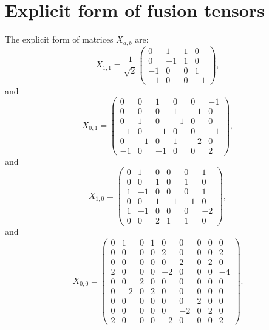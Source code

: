 \documentclass[prx, twocolumn, superscriptaddress, dvipsnames]{revtex4-2}
\theoremstyle{definition}
\begin{document}
\section{Explicit form of fusion tensors}
\label{app:fusion-tensor-expl}
The explicit form of matrices $X_{a,b}$ are:
\begin{equation}
    X_{1,1} = \frac{1}{\sqrt{2}}
    \begin{pmatrix}
        0 & 1 & 1 & 0 \\
        0 & -1 & 1 & 0 \\
        -1 & 0 & 0 & 1 \\
        -1 & 0 & 0 & -1 
    \end{pmatrix},
\end{equation}
and
\begin{equation}
    X_{0,1} =
    \begin{pmatrix}
        0 & 0 & 1 & 0 & 0 & -1 \\
        0 & 0 & 0 & 1 & -1 & 0 \\
        0 & 1 & 0 & -1 & 0 & 0 \\
        -1 & 0 & -1 & 0 & 0 & -1 \\
        0 & -1 & 0 & 1 & -2 & 0 \\
        -1 & 0 & -1 & 0 & 0 & 2
    \end{pmatrix},
\end{equation}
and
\begin{equation}
    X_{1,0} =
    \begin{pmatrix}
        0 & 1 & 0 & 0 & 0 & 1 \\
        0 & 0 & 1 & 0 & 1 & 0 \\
        1 & -1 & 0 & 0 & 0 & 1 \\
        0 & 0 & 1 & -1 & -1 & 0 \\
        1 & -1 & 0 & 0 & 0 & -2 \\
        0 & 0 & 2 & 1 & 1 & 0
    \end{pmatrix},
\end{equation}
and
\begin{equation}
    X_{0,0} = 
    \begin{pmatrix}
        0 & 1 & 0 & 1 & 0 & 0 & 0 & 0 & 0 \\
        0 & 0 & 0 & 0 & 2 & 0 & 0 & 0 & 2 \\
        0 & 0 & 0 & 0 & 0 & 2 & 0 & 2 & 0 \\
        2 & 0 & 0 & 0 & -2 & 0 & 0 & 0 & -4 \\
        0 & 0 & 2 & 0 & 0 & 0 & 0 & 0 & 0 \\
        0 & -2 & 0 & 2 & 0 & 0 & 0 & 0 & 0 \\
        0 & 0 & 0 & 0 & 0 & 0 & 2 & 0 & 0 \\
        0 & 0 & 0 & 0 & 0 & -2 & 0 & 2 & 0 \\
        2 & 0 & 0 & 0 & -2 & 0 & 0 & 0 & 2
    \end{pmatrix}.
\end{equation}
\end{document}
